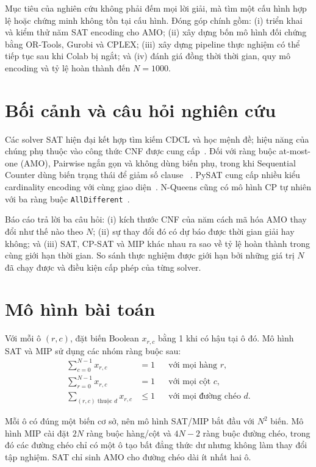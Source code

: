 \documentclass[a4paper,fleqn]{cas-sc}
\providecommand{\ReportPrefix}{}
\begin{document}
Mục tiêu của nghiên cứu không phải đếm mọi lời giải, mà tìm một cấu hình hợp lệ
hoặc chứng minh không tồn tại cấu hình. Đóng góp chính gồm: (i) triển khai và
kiểm thử năm SAT encoding cho AMO; (ii) xây dựng bốn mô hình đối chứng bằng
OR-Tools, Gurobi và CPLEX; (iii) xây dựng pipeline thực nghiệm có thể tiếp tục
sau khi Colab bị ngắt; và (iv) đánh giá đồng thời thời gian, quy mô encoding và
tỷ lệ hoàn thành đến $N=1000$.

\section{Bối cảnh và câu hỏi nghiên cứu}

Các solver SAT hiện đại kết hợp tìm kiếm CDCL và học mệnh đề; hiệu năng của
chúng phụ thuộc vào công thức CNF được cung cấp~\cite{glucose2009}. Đối với
ràng buộc at-most-one (AMO), Pairwise ngắn gọn và không dùng biến phụ, trong
khi Sequential Counter dùng biến trạng thái để giảm số clause
~\cite{sinz2005}. PySAT cung cấp nhiều kiểu cardinality encoding với cùng giao
diện~\cite{pysat-paper,pysat-docs}. N-Queens cũng có mô hình CP tự nhiên với
ba ràng buộc \texttt{AllDifferent}~\cite{ortools-nqueens}.

Báo cáo trả lời ba câu hỏi: (i) kích thước CNF của năm cách mã hóa AMO thay
đổi như thế nào theo $N$; (ii) sự thay đổi đó có dự báo được thời gian giải
hay không; và (iii) SAT, CP-SAT và MIP khác nhau ra sao về tỷ lệ hoàn thành
trong cùng giới hạn thời gian. So sánh thực nghiệm được giới hạn bởi những
giá trị $N$ đã chạy được và điều kiện cấp phép của từng solver.

\ifdefined\FullReport

\fi

\section{Mô hình bài toán}

Với mỗi ô $(r,c)$, đặt biến Boolean $x_{r,c}$ bằng 1 khi có hậu tại ô đó. Mô
hình SAT và MIP sử dụng các nhóm ràng buộc sau:
\begin{align}
  \sum_{c=0}^{N-1} x_{r,c} &= 1 && \text{với mọi hàng }r, \\
  \sum_{r=0}^{N-1} x_{r,c} &= 1 && \text{với mọi cột }c, \\
  \sum_{(r,c)\text{ thuộc }d} x_{r,c} &\leq 1
    && \text{với mọi đường chéo }d.
\end{align}

Mỗi ô có đúng một biến cơ sở, nên mô hình SAT/MIP bắt đầu với $N^2$ biến.
Mô hình MIP cài đặt $2N$ ràng buộc hàng/cột và $4N-2$ ràng buộc đường chéo,
trong đó các đường chéo chỉ có một ô tạo bất đẳng thức dư nhưng không làm
thay đổi tập nghiệm. SAT chỉ sinh AMO cho đường chéo dài ít nhất hai ô.
\end{document}
